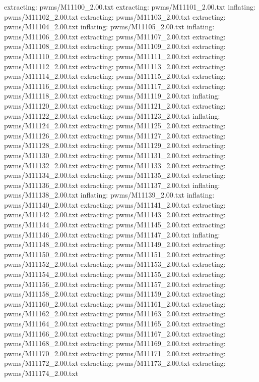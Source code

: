 \documentclass[letterpaper,10pt,english]{sphinxmanual}
\begin{document}
{\begin{sphinxVerbatim}[commandchars=\\\{\}]
 extracting: pwms/M11100\_2.00.txt
 extracting: pwms/M11101\_2.00.txt
  inflating: pwms/M11102\_2.00.txt
 extracting: pwms/M11103\_2.00.txt
 extracting: pwms/M11104\_2.00.txt
  inflating: pwms/M11105\_2.00.txt
  inflating: pwms/M11106\_2.00.txt
 extracting: pwms/M11107\_2.00.txt
 extracting: pwms/M11108\_2.00.txt
 extracting: pwms/M11109\_2.00.txt
 extracting: pwms/M11110\_2.00.txt
 extracting: pwms/M11111\_2.00.txt
 extracting: pwms/M11112\_2.00.txt
 extracting: pwms/M11113\_2.00.txt
 extracting: pwms/M11114\_2.00.txt
 extracting: pwms/M11115\_2.00.txt
 extracting: pwms/M11116\_2.00.txt
 extracting: pwms/M11117\_2.00.txt
 extracting: pwms/M11118\_2.00.txt
 extracting: pwms/M11119\_2.00.txt
  inflating: pwms/M11120\_2.00.txt
 extracting: pwms/M11121\_2.00.txt
 extracting: pwms/M11122\_2.00.txt
 extracting: pwms/M11123\_2.00.txt
  inflating: pwms/M11124\_2.00.txt
 extracting: pwms/M11125\_2.00.txt
 extracting: pwms/M11126\_2.00.txt
 extracting: pwms/M11127\_2.00.txt
 extracting: pwms/M11128\_2.00.txt
 extracting: pwms/M11129\_2.00.txt
 extracting: pwms/M11130\_2.00.txt
 extracting: pwms/M11131\_2.00.txt
 extracting: pwms/M11132\_2.00.txt
 extracting: pwms/M11133\_2.00.txt
 extracting: pwms/M11134\_2.00.txt
 extracting: pwms/M11135\_2.00.txt
 extracting: pwms/M11136\_2.00.txt
 extracting: pwms/M11137\_2.00.txt
  inflating: pwms/M11138\_2.00.txt
  inflating: pwms/M11139\_2.00.txt
  inflating: pwms/M11140\_2.00.txt
 extracting: pwms/M11141\_2.00.txt
 extracting: pwms/M11142\_2.00.txt
 extracting: pwms/M11143\_2.00.txt
 extracting: pwms/M11144\_2.00.txt
 extracting: pwms/M11145\_2.00.txt
 extracting: pwms/M11146\_2.00.txt
 extracting: pwms/M11147\_2.00.txt
  inflating: pwms/M11148\_2.00.txt
 extracting: pwms/M11149\_2.00.txt
 extracting: pwms/M11150\_2.00.txt
 extracting: pwms/M11151\_2.00.txt
 extracting: pwms/M11152\_2.00.txt
 extracting: pwms/M11153\_2.00.txt
 extracting: pwms/M11154\_2.00.txt
 extracting: pwms/M11155\_2.00.txt
 extracting: pwms/M11156\_2.00.txt
 extracting: pwms/M11157\_2.00.txt
 extracting: pwms/M11158\_2.00.txt
 extracting: pwms/M11159\_2.00.txt
 extracting: pwms/M11160\_2.00.txt
 extracting: pwms/M11161\_2.00.txt
 extracting: pwms/M11162\_2.00.txt
 extracting: pwms/M11163\_2.00.txt
 extracting: pwms/M11164\_2.00.txt
 extracting: pwms/M11165\_2.00.txt
 extracting: pwms/M11166\_2.00.txt
 extracting: pwms/M11167\_2.00.txt
 extracting: pwms/M11168\_2.00.txt
 extracting: pwms/M11169\_2.00.txt
 extracting: pwms/M11170\_2.00.txt
 extracting: pwms/M11171\_2.00.txt
 extracting: pwms/M11172\_2.00.txt
 extracting: pwms/M11173\_2.00.txt
 extracting: pwms/M11174\_2.00.txt

\end{sphinxVerbatim}}
\end{document}
